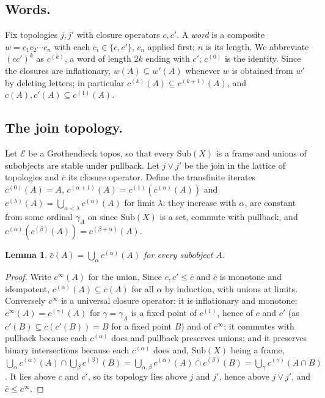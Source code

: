 \documentclass[11pt]{amsart}
\newtheorem{lem}[thm]{Lemma}
\theoremstyle{definition}
\newcommand{\Sub}{\mathrm{Sub}}
\newcommand{\cE}{\mathcal E}
\begin{document}
\subsection*{Words.}
Fix topologies $j,j'$ with closure operators $c,c'$. A \emph{word} is a
composite $w=c_1c_2\cdots c_n$ with each $c_i\in\{c,c'\}$, $c_n$ applied
first; $n$ is its length. We abbreviate $(cc')^k$ as $c^{(k)}$, a word of
length $2k$ ending with $c'$; $c^{(0)}$ is the identity. Since the closures
are inflationary, $w(A)\subseteq w'(A)$ whenever $w$ is obtained from $w'$ by
deleting letters; in particular $c^{(k)}(A)\subseteq c^{(k+1)}(A)$, and
$c(A),c'(A)\subseteq c^{(1)}(A)$.

\subsection*{The join topology.}
Let $\cE$ be a Grothendieck topos, so that every $\Sub(X)$ is a frame and
unions of subobjects are stable under pullback. Let $j\vee j'$ be the join
in the lattice of topologies and $\bar c$ its closure operator. Define the
transfinite iterates $c^{(0)}(A)=A$, $c^{(\alpha+1)}(A)=c^{(1)}(c^{(\alpha)}
(A))$ and $c^{(\lambda)}(A)=\bigcup_{\alpha<\lambda}c^{(\alpha)}(A)$ for
limit $\lambda$; they increase with $\alpha$, are constant from some ordinal
$\gamma_A$ on since $\Sub(X)$ is a set, commute with pullback, and
$c^{(\alpha)}(c^{(\beta)}(A))=c^{(\beta+\alpha)}(A)$.

\begin{lem}\label{lem:joinK}
$\bar c(A)=\bigcup_\alpha c^{(\alpha)}(A)$ for every subobject $A$.
\end{lem}
\begin{proof}
Write $c^\infty(A)$ for the union. Since $c,c'\le\bar c$ and $\bar c$ is
monotone and idempotent, $c^{(\alpha)}(A)\subseteq\bar c(A)$ for all $\alpha$
by induction, with unions at limits. Conversely $c^\infty$ is a universal
closure operator: it is inflationary and monotone; $c^\infty(A)=c^{(\gamma)}
(A)$ for $\gamma=\gamma_A$ is a fixed point of $c^{(1)}$, hence of $c$ and
$c'$ (as $c'(B)\subseteq c(c'(B))=B$ for a fixed point $B$) and of $c^\infty$;
it commutes with pullback because each $c^{(\alpha)}$ does and pullback
preserves unions; and it preserves binary intersections because each
$c^{(\alpha)}$ does and, $\Sub(X)$ being a frame,
$\bigcup_\alpha c^{(\alpha)}(A)\cap\bigcup_\beta c^{(\beta)}(B)=
\bigcup_{\alpha,\beta}c^{(\alpha)}(A)\cap c^{(\beta)}(B)=\bigcup_\gamma
c^{(\gamma)}(A\cap B)$. It lies above $c$ and $c'$, so its topology lies
above $j$ and $j'$, hence above $j\vee j'$, and $\bar c\le c^\infty$.
\end{proof}
\end{document}
